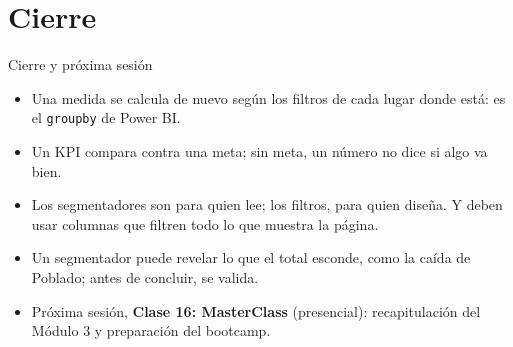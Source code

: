 \documentclass[aspectratio=169,11pt]{beamer}
\begin{document}
\section{Cierre}
\begin{frame}[t]{Cierre y próxima sesión}
  \begin{itemize}
    \item Una medida se calcula de nuevo según los filtros de cada lugar
      donde está: es el \texttt{groupby} de Power BI.
    \item Un KPI compara contra una meta; sin meta, un número no dice si
      algo va bien.
    \item Los segmentadores son para quien lee; los filtros, para quien
      diseña. Y deben usar columnas que filtren todo lo que muestra la
      página.
    \item Un segmentador puede revelar lo que el total esconde, como la
      caída de Poblado; antes de concluir, se valida.
    \item Próxima sesión, \textbf{Clase 16: MasterClass} (presencial):
      recapitulación del Módulo 3 y preparación del bootcamp.
  \end{itemize}
\end{frame}
\end{document}

